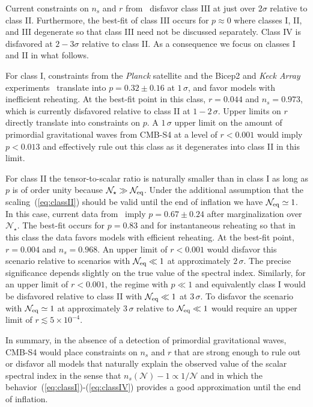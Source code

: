 Current constraints on $n_s$ and $r$ from~\cite{bicepkeckplanck15} disfavor class III at just over $2\sigma$ relative to class II. Furthermore, the best-fit of class III occurs for $p\approx 0$ where classes I, II, and III degenerate so that class III need not be discussed separately. Class IV is disfavored at $2-3\sigma$ relative to class II. As a consequence we focus on classes I and II in what follows.

For class I, constraints from the {\it Planck} satellite and the {\sc Bicep}2 and {\it Keck Array} experiments~\cite{bicepkeckplanck15} translate into $p=0.32\pm0.16$ at $1\,\sigma$, and favor models with inefficient reheating. At the best-fit point in this class, $r=0.044$ and $n_s=0.973$, which is currently disfavored relative to class II at $1-2\,\sigma$. Upper limits on $r$ directly translate into constraints on $p$. A $1\,\sigma$ upper limit on the amount of primordial gravitational waves from CMB-S4 at a level of $r<0.001$ would imply $p<0.013$ and effectively rule out this class as it degenerates into class II in this limit. 

For class II the tensor-to-scalar ratio is naturally smaller than in class I as long as $p$ is of order unity because $\mathcal{N}_\star\gg\mathcal{N}_{\rm eq}$. Under the additional assumption that the scaling~(\ref{eq:classII}) should be valid until the end of inflation we have $\mathcal{N}_{\rm eq}\simeq 1$. In this case, current data from~\cite{bicepkeckplanck15} imply $p=0.67\pm0.24$ after marginalization over $\mathcal{N}_\star$. The best-fit occurs for $p=0.83$ and for instantaneous reheating so that in this class the data favors models with efficient reheating. At the best-fit point, $r=0.004$ and $n_s=0.968$. An upper limit of $r<0.001$ would disfavor this scenario relative to scenarios with $\mathcal{N}_{\rm eq}\ll 1$ at approximately $2\,\sigma$. The precise significance depends slightly on the true value of the spectral index. Similarly, for an upper limit of $r<0.001$, the regime with $p\ll1$ and equivalently class I would be disfavored relative to class II with $\mathcal{N}_{\rm eq}\ll 1$ at $3\,\sigma$. To disfavor the scenario with $\mathcal{N}_{\rm eq}\simeq 1$ at approximately $3\,\sigma$ relative to $\mathcal{N}_{\rm eq}\ll 1$ would require an upper limit of $r\lesssim 5\times 10^{-4}$.  

In summary, in the absence of a detection of primordial gravitational waves, CMB-S4 would place constraints on $n_s$ and $r$ that are strong enough to rule out or disfavor all models that naturally explain the observed value of the scalar spectral index in the sense that $n_s(\mathcal{N})-1\propto 1/\mathcal{N}$ and in which the behavior~(\ref{eq:classI})-(\ref{eq:classIV}) provides a good approximation until the end of inflation. 


